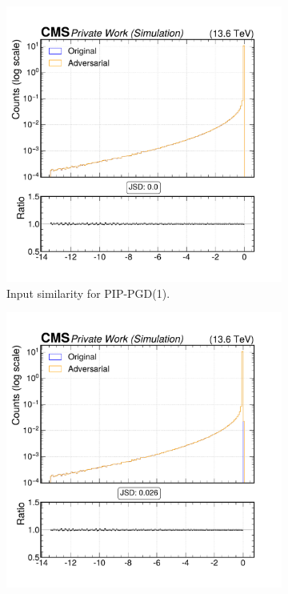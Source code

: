 \begin{figure}[h]
  \centering
  \begin{subfigure}[t]{0.32\textwidth}
    \includegraphics[width=\linewidth]{media/output/features/compare/combined_it_1/cmp_cpf_arr_Cpfcan_BtagPf_trackJetDistVal.pdf}
    \caption*{Input similarity for PIP-PGD(1).}
  \end{subfigure}\hfill
  \begin{subfigure}[t]{0.32\textwidth}
    \includegraphics[width=\linewidth]{media/output/features/compare/combined_it_2/cmp_cpf_arr_Cpfcan_BtagPf_trackJetDistVal.pdf}

\end{subfigure}
\end{figure}
